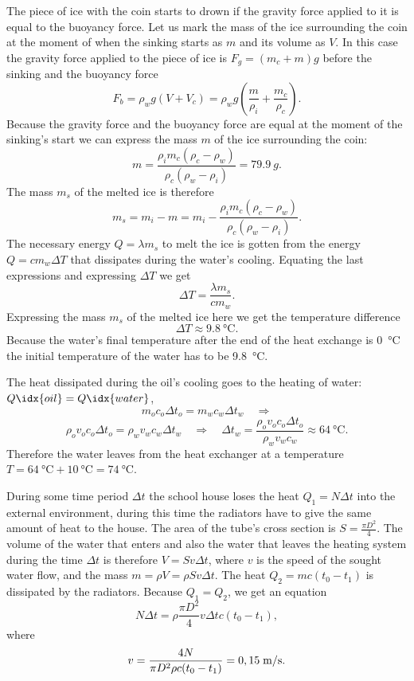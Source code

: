 \documentclass[11pt]{article}
\begin{document}
\solueng
The piece of ice with the coin starts to drown if the gravity force applied to it is equal to the buoyancy force. Let us mark the mass of the ice surrounding the coin at the moment of when the sinking starts as $m$ and its volume as $V$. In this case the gravity force applied to the piece of ice is $F_g=(m_c+m)g$ before the sinking and the buoyancy force 
\[ F_b=\rho_w g(V + V_c)=\rho_w g\left(\frac{m}{\rho_i} + \frac{m_c}{\rho_c}\right). \]
Because the gravity force and the buoyancy force are equal at the moment of the sinking's start we can express the mass $m$ of the ice surrounding the coin:
\[ m = \frac{\rho_i m_c(\rho_c - \rho_w)}{\rho_c(\rho_w - \rho_i)} = \SI{79,9}{g}. \] 
The mass $m_s$ of the melted ice is therefore
\[ m_s = m_i - m = m_i - \frac{\rho_i m_c(\rho_c - \rho_w)}{\rho_c(\rho_w - \rho_i)}. \]
The necessary energy $Q=\lambda m_s$ to melt the ice is gotten from the energy $Q=cm_w\Delta T$ that dissipates during the water's cooling. Equating the last expressions and expressing $\Delta T$ we get 
\[ \Delta  T = \frac{\lambda m_s}{cm_w}. \] 
Expressing the mass $m_s$ of the melted ice here we get the temperature difference
\[ \Delta T \approx \SI{9,8}{\degreeCelsius}. \] 
Because the water's final temperature after the end of the heat exchange is \SI{0}{\degreeCelsius} the initial temperature of the water has to be \SI{9,8}{\degreeCelsius}.
\probend
\bigskip


\solueng
The heat dissipated during the oil's cooling goes to the heating of water: $Q\idx{oil} = Q\idx{water}$,
\[ m_oc_o\Delta t_o = m_wc_w\Delta t_w \quad\Rightarrow \]
\[ \rho_ov_oc_o\Delta t_o = \rho_w v_wc_w\Delta t_w \quad\Rightarrow\quad \Delta t_w = \frac{\rho_ov_oc_o\Delta t_o}{\rho_wv_wc_w} \approx \SI{64}{\degreeCelsius}.  \]
Therefore the water leaves from the heat exchanger at a temperature $T = \SI{64}{\degreeCelsius} + \SI{10}{\degreeCelsius} = \SI{74}{\degreeCelsius}$.
\probend
\bigskip


\solueng
During some time period $\Delta t$ the school house loses the heat $Q_1=N\Delta t$ into the external environment, during this time the radiators have to give the same amount of heat to the house. The area of the tube's cross section is $S=\frac{\pi D^2}{4}$. The volume of the water that enters and also the water that leaves the heating system during the time $\Delta t$ is therefore $V=Sv\Delta t$, where $v$ is the speed of the sought water flow, and the mass $m=\rho V=\rho Sv\Delta t$. The heat $Q_2=mc(t_0-t_1)$ is dissipated by the radiators. Because $Q_1=Q_2$, we get an equation
\[
N\Delta t=\rho \frac{\pi D^2}{4}v\Delta t c (t_0-t_1),
\] 
where 
\[
v=\frac{4N}{\pi D^2\rho c (t_0-t_1)}=0,15\;\hbox{m/s}.
\]
\probend
\bigskip
\end{document}
